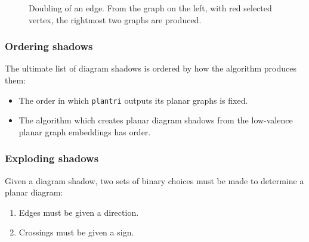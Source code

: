 \documentclass[presentation]{beamer}
\begin{document}
\begin{frame}
\begin{figure}
\begin{minipage}[c]{.32\linewidth}
      \vspace{0pt}
    \end{minipage}
    \caption{Doubling of an edge. From the graph on the left, with
      red selected vertex, the rightmost two graphs are produced.}
    \label{fig:edgedouble}
  \end{figure}

\end{frame}

\begin{frame}
  \frametitle{Ordering shadows}
  The ultimate list of diagram shadows is ordered by how the algorithm
  produces them:
  \begin{itemize}
  \item The order in which \texttt{plantri} outputs its planar graphs
    is fixed.
  \item The algorithm which creates planar diagram shadows from the
    low-valence planar graph embeddings has order.
  \end{itemize}
\end{frame}

\begin{frame}
  \frametitle{Exploding shadows}
  Given a diagram shadow, two sets of binary choices must be made to
  determine a planar diagram:
  \begin{enumerate}
  \item Edges must be given a direction.
  \item Crossings must be given a sign.
  \end{enumerate}
\end{frame}
\end{document}
